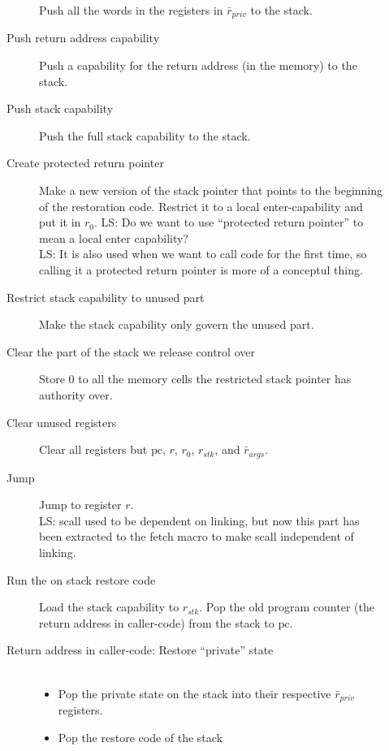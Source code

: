 \documentclass[a4paper]{article}
\newcommand{\forcenewline}{$\phantom{v}$\\}
\newcommand\lau[1]{{\color{purple} \sf \footnotesize {LS: #1}}\\}
\newcommand{\var}[1]{\mathit{#1}}
\newcommand{\pcreg}{\mathrm{pc}}
\begin{document}
\begin{description}
\begin{description}
                  Push all the words in the registers in  $\bar{r}_{\var{priv}}$ to the stack.
                \item [Push return address capability]
                  Push a capability for the return address (in the memory) to the stack.
                \item [Push stack capability]
                  Push the full stack capability to the stack.
                \item [Create protected return pointer]
                  Make a new version of the stack pointer that points to the beginning of the restoration code. Restrict it to a local enter-capability and put it in $r_0$. \lau{Do we want to use ``protected return pointer'' to mean a local enter capability?} \lau{It is also used when we want to call code for the first time, so calling it a protected return pointer is more of a conceptul thing.}
                \item [Restrict stack capability to unused part]
                  Make the stack capability only govern the unused part.
                \item [Clear the part of the stack we release control over]
                  Store 0 to all the memory cells the restricted stack pointer has authority over.
                \item [Clear unused registers]
                  Clear all registers but $\pcreg$, $r$, $r_0$, $r_{\var{stk}}$, and $\bar{r}_{\var{args}}$.
                \item [Jump] Jump to register $r$.
\\ \lau{scall used to be dependent on linking, but now this part has been extracted to the fetch macro to make scall independent of linking.}
                \item [Run the on stack restore code]
                  Load the stack capability to $r_{\var{stk}}$. Pop the old program counter (the return address in caller-code) from the stack to $\pcreg$.
                \item [Return address in caller-code: Restore ``private'' state] \forcenewline
                  \begin{itemize}
                  \item Pop the private state on the stack into their respective $\bar{r}_{\var{priv}}$ registers.
                  \item Pop the restore code of the stack
                  \end{itemize}\
                \end{description}
              \end{description}
\end{document}
